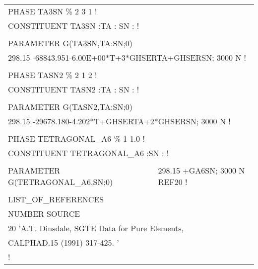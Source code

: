 \begin{longtable}[H]{ l l l }
	\multicolumn{3}{l}{PHASE TA3SN  \%  2 3   1 !}\\
	\multicolumn{3}{l}{CONSTITUENT TA3SN  :TA : SN :  !}\\
	& & \\
	PARAMETER G(TA3SN,TA:SN;0) & & \\
	\multicolumn{3}{l}{298.15 -68843.951-6.00E+00*T+3*GHSERTA+GHSERSN; 3000 N !}\\
	& & \\
	\multicolumn{3}{l}{PHASE TASN2  \%  2 1   2 !}\\
	\multicolumn{3}{l}{CONSTITUENT TASN2  :TA : SN :  !}\\
	& & \\
	PARAMETER G(TASN2,TA:SN;0) & &\\
	\multicolumn{3}{l}{298.15 -29678.180-4.202*T+GHSERTA+2*GHSERSN; 3000 N !}\\
	& & \\
	\multicolumn{3}{l}{PHASE TETRAGONAL\_A6  \%  1  1.0  !}\\
	\multicolumn{3}{l}{CONSTITUENT TETRAGONAL\_A6  :SN :  !}\\
	& & \\
	PARAMETER G(TETRAGONAL\_A6,SN;0) & \multicolumn{2}{l}{298.15 +GA6SN; 3000 N REF20 !}\\
	& & \\
	\multicolumn{3}{l}{LIST\_OF\_REFERENCES}\\
	\multicolumn{3}{l}{NUMBER  SOURCE}\\
	\multicolumn{3}{l}{20 'A.T. Dinsdale, SGTE Data for Pure Elements,}\\
	\multicolumn{3}{l}{CALPHAD.15 (1991) 317-425. '}\\
	\multicolumn{3}{l}{!}\\
\end{longtable}